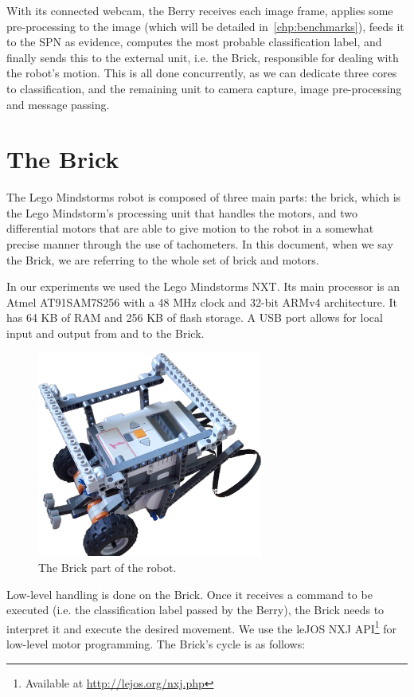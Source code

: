 With its connected webcam, the Berry receives each image frame, applies some pre-processing to the
image (which will be detailed in~\autoref{chp:benchmarks}), feeds it to the SPN as evidence,
computes the most probable classification label, and finally sends this to the external unit, i.e.
the Brick, responsible for dealing with the robot's motion. This is all done concurrently, as we
can dedicate three cores to classification, and the remaining unit to camera capture, image
pre-processing and message passing.

\section{The Brick}

The Lego Mindstorms robot is composed of three main parts: the brick, which is the Lego Mindstorm's
processing unit that handles the motors, and two differential motors that are able to give motion
to the robot in a somewhat precise manner through the use of tachometers. In this document, when we
say the Brick, we are referring to the whole set of brick and motors.

In our experiments we used the Lego Mindstorms NXT. Its main processor is an Atmel AT91SAM7S256
with a 48 MHz clock and 32-bit ARMv4 architecture. It has 64 KB of RAM and 256 KB of flash storage.
A USB port allows for local input and output from and to the Brick.

\begin{figure}[h]
  \centering\includegraphics[width=0.66\textwidth]{imgs/brick.png}
  \caption{The Brick part of the robot.}
\end{figure}

Low-level handling is done on the Brick. Once it receives a command to be executed (i.e. the
classification label passed by the Berry), the Brick needs to interpret it and execute the desired
movement. We use the leJOS NXJ API\footnote{Available at \url{http://lejos.org/nxj.php}} for
low-level motor programming. The Brick's cycle is as follows:

